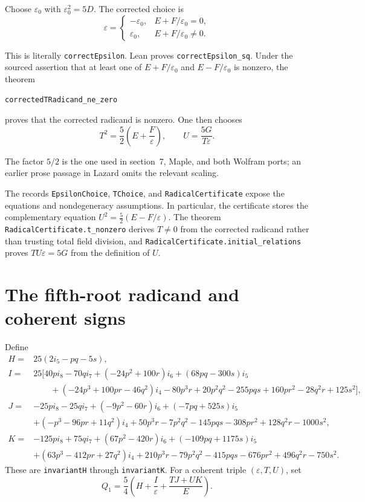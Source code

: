 \documentclass[11pt,a4paper,oneside]{article}
\newcommand{\lean}[1]{\nolinkurl{#1}}
\newcommand{\eps}{\varepsilon}
\newcommand{\ii}[1]{i_{#1}}
\begin{document}
Choose $\eps_0$ with $\eps_0^2=5D$.  The corrected choice is
\begin{equation}\label{eq:eps-correct}
 \eps=\begin{cases}
 -\eps_0,&E+F/\eps_0=0,\\
 \eps_0,&E+F/\eps_0\ne0.
 \end{cases}
\end{equation}
\begin{samepage}
This is literally \lean{correctEpsilon}.  Lean proves
\lean{correctEpsilon_sq}.  Under the sourced assertion that at least one of
$E+F/\eps_0$ and $E-F/\eps_0$ is nonzero, the theorem
\begin{center}
\lean{correctedTRadicand_ne_zero}
\end{center}
proves that the corrected radicand is nonzero.  One then chooses
\begin{equation}\label{eq:TU}
 T^2=\frac52\left(E+\frac F\eps\right),\qquad
 U=\frac{5G}{T\eps}.
\end{equation}
\end{samepage}
The factor $5/2$ is the one used in section~7, Maple, and both Wolfram ports;
an earlier prose passage in Lazard omits the relevant scaling.

The records \lean{EpsilonChoice}, \lean{TChoice}, and
\lean{RadicalCertificate} expose the equations and nondegeneracy assumptions.
In particular, the certificate stores the complementary equation
$U^2=\frac52(E-F/\eps)$.  The theorem
\lean{RadicalCertificate.t_nonzero} derives $T\ne0$ from the corrected
radicand rather than trusting total field division, and
\lean{RadicalCertificate.initial_relations} proves $TU\eps=5G$ from the
definition of $U$.

\section{The fifth-root radicand and coherent signs}

Define
\begin{align*}
H={}&25(2\ii5-pq-5s),\\
I={}&25\bigl[40p\ii8-70q\ii7+(-24p^2+100r)\ii6+(68pq-300s)\ii5\\
&\qquad+(-24p^3+100pr-46q^2)\ii4-80p^3r+20p^2q^2-255pqs
 +160pr^2-28q^2r+125s^2\bigr],\\
J={}&-25p\ii8-25q\ii7+(-9p^2-60r)\ii6+(-7pq+525s)\ii5\\
&+(-p^3-96pr+11q^2)\ii4+50p^3r-7p^2q^2-145pqs-308pr^2
 +128q^2r-1000s^2,\\
K={}&-125p\ii8+75q\ii7+(67p^2-420r)\ii6+(-109pq+1175s)\ii5\\
&+(63p^3-412pr+27q^2)\ii4+210p^3r-79p^2q^2-415pqs-676pr^2
 +496q^2r-750s^2.
\end{align*}
These are \lean{invariantH} through \lean{invariantK}.  For a coherent
triple $(\eps,T,U)$, set
\begin{equation}\label{eq:q1}
 Q_1=\frac54\left(H+\frac I\eps+\frac{TJ+UK}{E}\right).
\end{equation}
\end{document}
